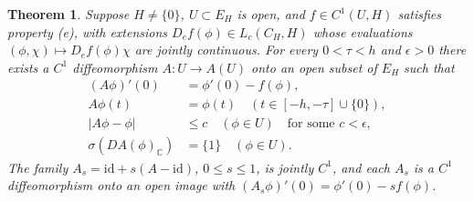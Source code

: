 \documentclass[11pt]{article}
\newtheorem{theorem}{Theorem}[section]
\newcommand{\id}{\mathrm{id}}
\begin{document}
\begin{theorem}\label{thm:hilbert}
Suppose $H\ne\{0\}$, $U\subset E_H$ is open, and
$f\in C^1(U,H)$ satisfies property \textup{(e)}, with extensions
$D_ef(\phi)\in L_c(C_H,H)$ whose evaluations
$(\phi,\chi)\mapsto D_ef(\phi)\chi$ are jointly continuous.
For every $0<\tau<h$ and $\epsilon>0$ there exists a $C^1$
diffeomorphism $A:U\to A(U)$ onto an open subset of $E_H$ such that
\begin{align*}
 (A\phi)'(0)&=\phi'(0)-f(\phi),\\
 A\phi(t)&=\phi(t)\quad(t\in[-h,-\tau]\cup\{0\}),\\
 |A\phi-\phi|&\le c\quad(\phi\in U)
   \quad\text{for some }c<\epsilon,\\
 \sigma(DA(\phi)_{\mathbb C})&=\{1\}\quad(\phi\in U).
\end{align*}
The family $A_s=\id+s(A-\id)$, $0\le s\le1$, is jointly
$C^1$, and each $A_s$ is a $C^1$ diffeomorphism onto an open
image with $(A_s\phi)'(0)=\phi'(0)-sf(\phi)$.
\end{theorem}
\end{document}
